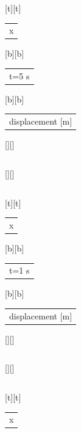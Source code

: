 %    
%
%
\begin{psfrags}%
\psfragscanon%
%
[t][t]{\color[rgb]{0,0,0}\setlength{\tabcolsep}{0pt}\begin{tabular}{c}{x}\end{tabular}}%
[b][b]{\color[rgb]{0,0,0}\setlength{\tabcolsep}{0pt}\begin{tabular}{c}t=5 s\end{tabular}}%
[b][b]{\color[rgb]{0,0,0}\setlength{\tabcolsep}{0pt}\begin{tabular}{c}displacement [m]\end{tabular}}%
[][]{\color[rgb]{0,0,0}\setlength{\tabcolsep}{0pt}\begin{tabular}{c} \end{tabular}}%
[][]{\color[rgb]{0,0,0}\setlength{\tabcolsep}{0pt}\begin{tabular}{c} \end{tabular}}%
[t][t]{\color[rgb]{0,0,0}\setlength{\tabcolsep}{0pt}\begin{tabular}{c}{x}\end{tabular}}%
[b][b]{\color[rgb]{0,0,0}\setlength{\tabcolsep}{0pt}\begin{tabular}{c}t=1 s\end{tabular}}%
[b][b]{\color[rgb]{0,0,0}\setlength{\tabcolsep}{0pt}\begin{tabular}{c}displacement [m]\end{tabular}}%
[][]{\color[rgb]{0,0,0}\setlength{\tabcolsep}{0pt}\begin{tabular}{c} \end{tabular}}%
[][]{\color[rgb]{0,0,0}\setlength{\tabcolsep}{0pt}\begin{tabular}{c} \end{tabular}}%
[t][t]{\color[rgb]{0,0,0}\setlength{\tabcolsep}{0pt}\begin{tabular}{c}{x}\end{tabular}}%

\end{psfrags}
